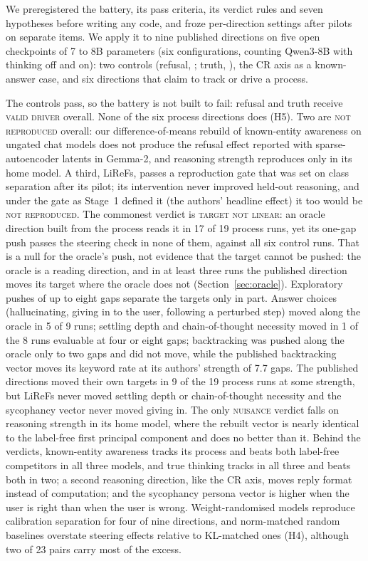 \documentclass[11pt]{article}
\newcommand{\verdict}[1]{\textsc{\MakeLowercase{#1}}}
\begin{document}
We preregistered the battery, its pass criteria, its verdict rules and seven hypotheses before writing any code, and froze per-direction settings after pilots on separate items. We apply it to nine published directions on five open checkpoints of 7 to 8B parameters (six configurations, counting Qwen3-8B with thinking off and on): two controls (refusal, \citealp{arditi2024refusal}; truth, \citealp{marks2024geometry}), the CR axis as a known-answer case, and six directions that claim to track or drive a process.

The controls pass, so the battery is not built to fail: refusal and truth receive \verdict{VALID DRIVER} overall. None of the six process directions does (H5). Two are \verdict{NOT REPRODUCED} overall: our difference-of-means rebuild of known-entity awareness on ungated chat models does not produce the refusal effect reported with sparse-autoencoder latents in Gemma-2, and reasoning strength reproduces only in its home model. A third, LiReFs, passes a reproduction gate that was set on class separation after its pilot; its intervention never improved held-out reasoning, and under the gate as Stage~1 defined it (the authors' headline effect) it too would be \verdict{NOT REPRODUCED}. The commonest verdict is \verdict{TARGET NOT LINEAR}: an oracle direction built from the process reads it in 17 of 19 process runs, yet its one-gap push passes the steering check in none of them, against all six control runs. That is a null for the oracle's push, not evidence that the target cannot be pushed: the oracle is a reading direction, and in at least three runs the published direction moves its target where the oracle does not (Section~\ref{sec:oracle}). Exploratory pushes of up to eight gaps separate the targets only in part. Answer choices (hallucinating, giving in to the user, following a perturbed step) moved along the oracle in 5 of 9 runs; settling depth and chain-of-thought necessity moved in 1 of the 8 runs evaluable at four or eight gaps; backtracking was pushed along the oracle only to two gaps and did not move, while the published backtracking vector moves its keyword rate at its authors' strength of 7.7 gaps. The published directions moved their own targets in 9 of the 19 process runs at some strength, but LiReFs never moved settling depth or chain-of-thought necessity and the sycophancy vector never moved giving in. The only \verdict{NUISANCE} verdict falls on reasoning strength in its home model, where the rebuilt vector is nearly identical to the label-free first principal component and does no better than it. Behind the verdicts, known-entity awareness tracks its process and beats both label-free competitors in all three models, and true thinking tracks in all three and beats both in two; a second reasoning direction, like the CR axis, moves reply format instead of computation; and the sycophancy persona vector is higher when the user is right than when the user is wrong. Weight-randomised models reproduce calibration separation for four of nine directions, and norm-matched random baselines overstate steering effects relative to KL-matched ones (H4), although two of 23 pairs carry most of the excess.
\end{document}
